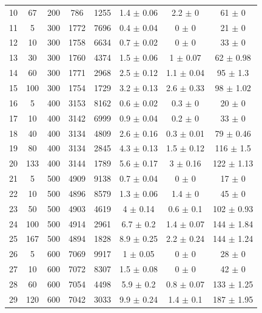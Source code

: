 \documentclass[11pt]{article}
\begin{document}
\begin{table}[]
{\begin{tabular}{cccccccc}
				10 & 67 & 200 & 786 & 1255 & 1.4 $\pm$ 0.06 & 2.2 $\pm$ 0 & 61 $\pm$ 0 \\
				\rowcolor[HTML]{EFEFEF} 
				11 & 5 & 300 & 1772 & 7696 & 0.4 $\pm$ 0.04 & 0 $\pm$ 0 & 21 $\pm$ 0 \\
				\rowcolor[HTML]{EFEFEF} 
				12 & 10 & 300 & 1758 & 6634 & 0.7 $\pm$ 0.02 & 0 $\pm$ 0 & 33 $\pm$ 0 \\
				\rowcolor[HTML]{EFEFEF} 
				13 & 30 & 300 & 1760 & 4374 & 1.5 $\pm$ 0.06 & 1 $\pm$ 0.07 & 62 $\pm$ 0.98 \\
				\rowcolor[HTML]{EFEFEF} 
				14 & 60 & 300 & 1771 & 2968 & 2.5 $\pm$ 0.12 & 1.1 $\pm$ 0.04 & 95 $\pm$ 1.3 \\
				\rowcolor[HTML]{EFEFEF} 
				15 & 100 & 300 & 1754 & 1729 & 3.2 $\pm$ 0.13 & 2.6 $\pm$ 0.33 & 98 $\pm$ 1.02 \\
				16 & 5 & 400 & 3153 & 8162 & 0.6 $\pm$ 0.02 & 0.3 $\pm$ 0 & 20 $\pm$ 0 \\
				17 & 10 & 400 & 3142 & 6999 & 0.9 $\pm$ 0.04 & 0.2 $\pm$ 0 & 33 $\pm$ 0 \\
				18 & 40 & 400 & 3134 & 4809 & 2.6 $\pm$ 0.16 & 0.3 $\pm$ 0.01 & 79 $\pm$ 0.46 \\
				19 & 80 & 400 & 3134 & 2845 & 4.3 $\pm$ 0.13 & 1.5 $\pm$ 0.12 & 116 $\pm$ 1.5 \\
				20 & 133 & 400 & 3144 & 1789 & 5.6 $\pm$ 0.17 & 3 $\pm$ 0.16 & 122 $\pm$ 1.13 \\
				\rowcolor[HTML]{EFEFEF} 
				21 & 5 & 500 & 4909 & 9138 & 0.7 $\pm$ 0.04 & 0 $\pm$ 0 & 17 $\pm$ 0 \\
				\rowcolor[HTML]{EFEFEF} 
				22 & 10 & 500 & 4896 & 8579 & 1.3 $\pm$ 0.06 & 1.4 $\pm$ 0 & 45 $\pm$ 0 \\
				\rowcolor[HTML]{EFEFEF} 
				23 & 50 & 500 & 4903 & 4619 & 4 $\pm$ 0.14 & 0.6 $\pm$ 0.1 & 102 $\pm$ 0.93 \\
				\rowcolor[HTML]{EFEFEF} 
				24 & 100 & 500 & 4914 & 2961 & 6.7 $\pm$ 0.2 & 1.4 $\pm$ 0.07 & 144 $\pm$ 1.84 \\
				\rowcolor[HTML]{EFEFEF} 
				25 & 167 & 500 & 4894 & 1828 & 8.9 $\pm$ 0.25 & 2.2 $\pm$ 0.24 & 144 $\pm$ 1.24 \\
				26 & 5 & 600 & 7069 & 9917 & 1 $\pm$ 0.05 & 0 $\pm$ 0 & 28 $\pm$ 0 \\
				27 & 10 & 600 & 7072 & 8307 & 1.5 $\pm$ 0.08 & 0 $\pm$ 0 & 42 $\pm$ 0 \\
				28 & 60 & 600 & 7054 & 4498 & 5.9 $\pm$ 0.2 & 0.8 $\pm$ 0.07 & 133 $\pm$ 1.25 \\
				29 & 120 & 600 & 7042 & 3033 & 9.9 $\pm$ 0.24 & 1.4 $\pm$ 0.1 & 187 $\pm$ 1.95 \\

\end{tabular}}
\end{table}
\end{document}
